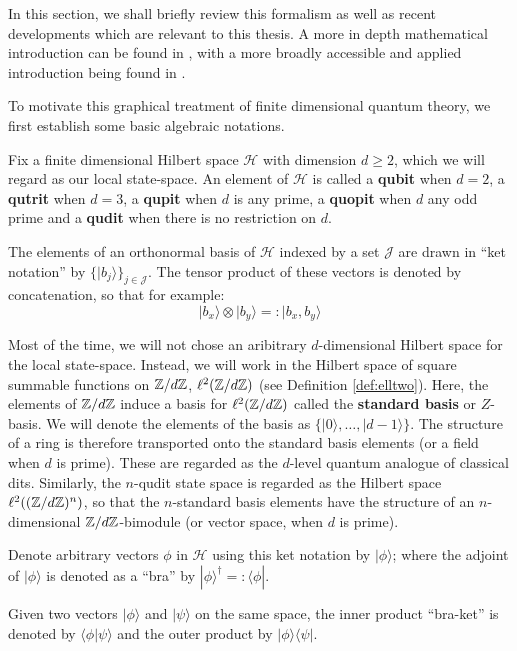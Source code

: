 In this section, we shall briefly review this formalism as well as recent developments which are relevant to this thesis.  A more in depth mathematical introduction can be found in \cite{heunen}, with a more broadly accessible and applied introduction being found in \cite{pqp}.


To motivate this graphical treatment of finite dimensional quantum theory, we first establish some basic algebraic notations.


Fix a finite dimensional Hilbert space $\mathcal H$ with dimension $d\geq 2$, which we will regard as our local state-space. An element of  $\mathcal H$ is called a {\bf qubit} when $d=2$, a {\bf qutrit} when $d=3$, a {\bf qupit} when $d$ is any prime, a {\bf quopit} when $d$ any odd prime and  a {\bf qudit} when there is no restriction on $d$.

The elements of an orthonormal basis of $\mathcal H$ indexed by a set $\mathcal J$ are drawn in ``ket notation'' by $\{|b_{j}\rangle \}_{j \in \mathcal J}$.
The tensor product of these vectors is denoted by concatenation, so that for example:
$$
| b_x \rangle \otimes | b_y\rangle =: |b_x,b_y \rangle  
$$


Most of the time,  we will not chose an aribitrary $d$-dimensional Hilbert space for the local state-space.  Instead, we will work in the Hilbert space of square summable functions on $\mathbb{Z}/d\mathbb{Z}$, $\ell^2(\mathbb{Z}/d\mathbb{Z})$ (see Definition \ref{def:elltwo}).  Here, the elements of $\mathbb{Z}/d\mathbb{Z}$ induce a basis for  $\ell^2(\mathbb{Z}/d\mathbb{Z})$ called the {\bf standard basis} or $Z$-basis.  We will denote the elements of the basis  as  $\{| 0\rangle , \ldots, |d-1\rangle \}$.  The structure of a ring is therefore transported onto the standard basis elements (or a field when $d$ is prime).  These are regarded as the $d$-level quantum analogue of classical dits.    Similarly, the $n$-qudit state space is regarded as the Hilbert space $\ell^2((\mathbb{Z}/d\mathbb{Z})^n)$, so that the $n$-standard basis elements have the structure of an $n$-dimensional $\mathbb{Z}/d\mathbb{Z}$-bimodule (or vector space, when $d$ is prime).

Denote arbitrary vectors $\phi$ in $\mathcal H$ using this ket notation by $|\phi \rangle$; where the adjoint of $|\phi \rangle$ is denoted as a ``bra''  by $|\phi \rangle^\dag =: \langle \phi |$. 

Given two vectors $|\phi \rangle$ and $| \psi \rangle$ on the same space, the inner product ``bra-ket'' is denoted by $\langle \phi | \psi \rangle$ and the outer product by $|\phi \rangle\langle \psi|$. 


